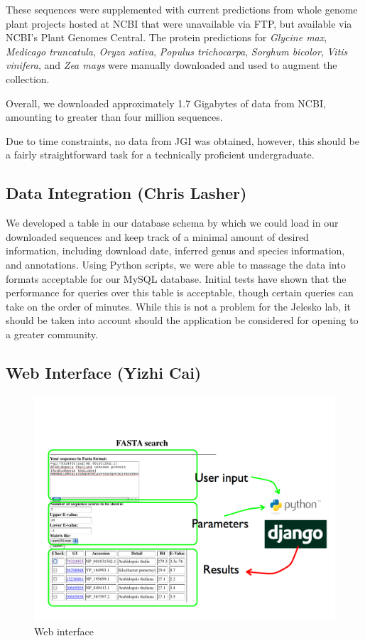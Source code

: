 \documentclass[11pt,letterpaper,twoside,english]{article}
\begin{document}
These sequences were supplemented with current predictions from whole genome
plant projects hosted at NCBI that were unavailable via FTP, but available via
NCBI's Plant Genomes Central. The protein predictions for \textit{Glycine
max}, \textit{Medicago truncatula}, \textit{Oryza sativa}, \textit{Populus
trichocarpa}, \textit{Sorghum bicolor}, \textit{Vitis vinifera}, and
\textit{Zea mays} were manually downloaded and used to augment the collection.

Overall, we downloaded approximately 1.7 Gigabytes of data from NCBI,
amounting to greater than four million sequences.

Due to time constraints, no data from JGI was obtained, however, this should
be a fairly straightforward task for a technically proficient undergraduate.

\subsection{Data Integration (Chris Lasher)}

We developed a table in our database schema by which we could load in our
downloaded sequences and keep track of a minimal amount of desired
information, including download date, inferred genus and species information,
and annotations. Using Python scripts, we were able to massage the data into
formats acceptable for our MySQL database. Initial tests have shown that the
performance for queries over this table is acceptable, though certain queries
can take on the order of minutes. While this is not a problem for the Jelesko
lab, it should be taken into account should the application be considered for
opening to a greater community.

\subsection{Web Interface (Yizhi Cai)}

\begin{figure}[tbph]
    \begin{center}
        \includegraphics[width=1\linewidth]{figures/web_interface}
    \end{center}
    \caption{\label{fig:Web-interface}Web interface}
\end{figure}
\end{document}
